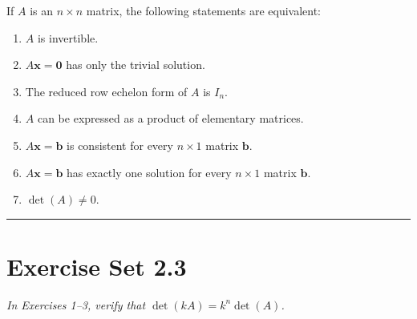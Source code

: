 \documentclass{article}
\theoremstyle{mystyle}
\begin{document}
\begin{tcolorbox}[colback=red!4, colframe=red!60!black,
  title={\textbf{Theorem 2.3.8 --- Equivalent Statements}}, boxrule=0.5mm, arc=3mm]
If $A$ is an $n\times n$ matrix, the following statements are equivalent:
\begin{enumerate}
  \item[(a)] $A$ is invertible.
  \item[(b)] $A\mathbf{x}=\mathbf{0}$ has only the trivial solution.
  \item[(c)] The reduced row echelon form of $A$ is $I_n$.
  \item[(d)] $A$ can be expressed as a product of elementary matrices.
  \item[(e)] $A\mathbf{x}=\mathbf{b}$ is consistent for every $n\times 1$ matrix $\mathbf{b}$.
  \item[(f)] $A\mathbf{x}=\mathbf{b}$ has exactly one solution for every $n\times 1$ matrix $\mathbf{b}$.
  \item[(g)] $\det(A)\neq 0$.
\end{enumerate}
\end{tcolorbox}

\vspace{5mm}

\noindent\rule{\linewidth}{0.5pt}

\section*{Exercise Set 2.3}

\noindent\textit{In Exercises 1--3, verify that $\det(kA)=k^n\det(A)$.}
\end{document}
